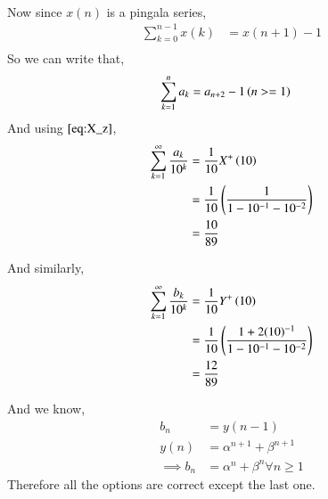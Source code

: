 \documentclass[journal,12pt,twocolumn]{IEEEtran}
\renewcommand\thesection{\arabic{section}}
\begin{document}
\begin{enumerate}[label=\thesection.\arabic*,ref=\thesection.\theenumi]
\begin{align}
   \end{align}
Now since $x(n)$ is a pingala series,
 \begin{align}
	 \sum_{k=0}^{n-1}x(k) &= x(n+1) - 1  \\
 \end{align}
 So we can write that,
  \begin{align}
	  \sum_{k=1}^{n}a_k &= a_{n+2} - 1  \left(n >=1\right)
  \end{align}
  And using $\eqref{eq:X_z}$,
 \begin{align}
	 \sum_{k=1}^{\infty}\frac{a_k}{10^k}&= \frac{1}{10}X^{+}\left(10\right) \\
					    &= \frac{1}{10}\left(\frac{1}{1 - 10^{-1} - 10^{-2}}\right) \\
					    &= \frac{10}{89}
 \end{align}

And similarly,
 \begin{align}
       \sum_{k=1}^{\infty}\frac{b_k}{10^k}&= \frac{1}{10}Y^{+}\left(10\right) \\
					  &= \frac{1}{10}\left(\frac{1 + 2(10)^{-1}}{1 - 10^{-1} - 10^{-2}}\right) \\
					    &= \frac{12}{89}
 \end{align}

And we know,
 \begin{align}
	 b_n &= y(n-1) \\
	y(n) &= \alpha^{n+1} + \beta^{n+1} \\
	\implies b_n &= \alpha^{n} + \beta^{n} \forall n \ge 1
 \end{align}
Therefore all the options are correct except the last one.
\end{enumerate}
\end{document}
